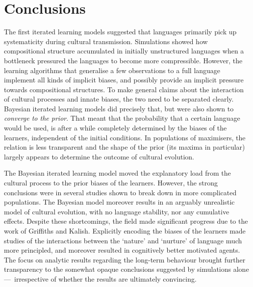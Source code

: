 \documentclass{../src/bcthesispart}
\begin{document}
\section{Conclusions}


The first iterated learning models suggested that languages primarily pick up systematicity during cultural transmission.
Simulations showed how compositional structure accumulated in initially unstructured languages when a bottleneck pressured the languages to become more compressible.
However, the learning algorithms that generalise a few observations to a full language implement all kinds of implicit biases, and possibly provide an implicit pressure towards compositional structures.
To make general claims about the interaction of cultural processes and innate biases, the two need to be separated clearly.
Bayesian iterated learning models did precisely that, but were also shown to \emph{converge to the prior}.
That meant that the probability that a certain language would be used, is after a while completely determined by the biases of the learners, independent of the initial conditions.
In populations of maximisers, the relation is less transparent and the shape of the prior (its maxima in particular) largely appears to determine the outcome of cultural evolution.




The Bayesian iterated learning model moved the explanatory load from the cultural process to the prior biases of the learners.
However, the strong conclusions were in several studies shown to break down in more complicated populations.
The Bayesian model moreover results in an arguably unrealistic model of cultural evolution, with no language stability, nor any cumulative effects.
Despite these shortcomings, the field made significant progress due to the work of Griffiths and Kalish.
Explicitly encoding the biases of the learners made studies of the interactions between the ‘nature’ and ‘nurture’ of language much more principled, and moreover resulted in cognitively better motivated agents.
The focus on analytic results regarding the long-term behaviour brought further transparency to the somewhat opaque conclusions suggested by simulations alone — irrespective of whether the results are ultimately convincing.
\end{document}
